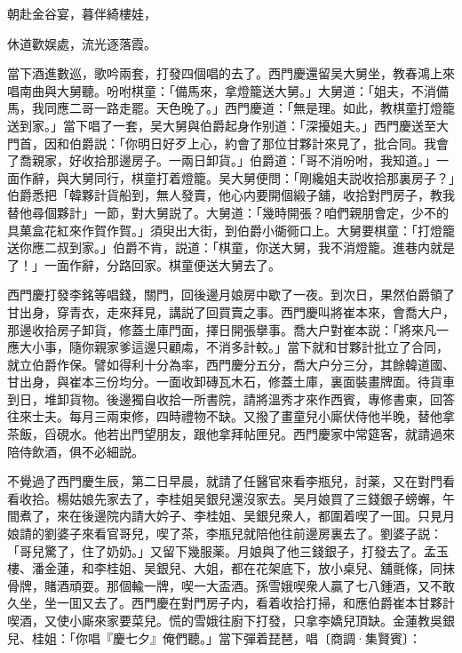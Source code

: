 \begin{myquote}
朝赴金谷宴，暮伴綺樓娃，

休道歡娱處，流光逐落霞。
\end{myquote}

當下酒進數巡，歌吟兩套，打發四個唱的去了。西門慶還留吴大舅坐，教春鴻上來唱南曲與大舅聽。吩咐棋童：「備馬來，拿燈籠送大舅。」大舅道：「姐夫，不消備馬，我同應二哥一路走罷。天色晚了。」西門慶道：「無是理。如此，教棋童打燈籠送到家。」當下唱了一套，吴大舅與伯爵起身作别道：「深擾姐夫。」西門慶送至大門首，因和伯爵説：「你明日好歹上心，約會了那位甘夥計來見了，批合同。我會了喬親家，好收拾那邊房子。一兩日卸貨。」伯爵道：「哥不消吩咐，我知道。」一面作辭，與大舅同行，棋童打着燈籠。吴大舅便問：「剛纔姐夫説收拾那裏房子？」伯爵悉把「韓夥計貨船到，無人發賣，他心内要開個緞子舖，收拾對門房子，教我替他尋個夥計」一節，對大舅説了。大舅道：「幾時開張？咱們親朋會定，少不的具菓盒花紅來作賀作賀。」須臾出大街，到伯爵小衚衕口上。大舅要棋童：「打燈籠送你應二叔到家。」伯爵不肯，説道：「棋童，你送大舅，我不消燈籠。進巷内就是了！」一面作辭，分路回家。棋童便送大舅去了。

西門慶打發李銘等唱錢，關門，回後邊月娘房中歇了一夜。到次日，果然伯爵領了甘出身，穿青衣，走來拜見，講説了回買賣之事。西門慶叫將崔本來，會喬大户，那邊收拾房子卸貨，修蓋土庫門面，擇日開張擧事。喬大户對崔本説：「將來凡一應大小事，隨你親家爹這邊只顧䖏，不消多計較。」當下就和甘夥計批立了合同，就立伯爵作保。譬如得利十分為率，西門慶分五分，喬大户分三分，其餘韓道國、甘出身，與崔本三份均分。一面收卸磚瓦木石，修蓋土庫，裏面裝畫牌面。待貨車到日，堆卸貨物。後邊獨自收拾一所書院，請將溫秀才來作西賓，專修書柬，回答往來士夫。每月三兩束修，四時禮物不缺。又撥了畫童兒小廝伏侍他半晚，替他拿茶飯，舀硯水。他若出門望朋友，跟他拿拜帖匣兒。西門慶家中常筵客，就請過來陪侍飲酒，俱不必細説。

不覺過了西門慶生辰，第二日早晨，就請了任醫官來看李瓶兒，討薬，又在對門看看收拾。楊姑娘先家去了，李桂姐吴銀兒還沒家去。吴月娘買了三錢銀子螃蠏，午間煮了，來在後邊院内請大妗子、李桂姐、吴銀兒衆人，都圍着喫了一囬。只見月娘請的劉婆子來看官哥兒，喫了茶，李瓶兒就陪他往前邊房裏去了。劉婆子説：「哥兒驚了，住了奶奶。」又留下幾服薬。月娘與了他三錢銀子，打發去了。孟玉樓、潘金蓮，和李桂姐、吴銀兒、大姐，都在花架底下，放小桌兒、舖氈條，同抹骨牌，賭酒頑耍。那個輸一牌，喫一大盃酒。孫雪娥喫衆人贏了七八鍾酒，又不敢久坐，坐一囬又去了。西門慶在對門房子内，看着收拾打掃，和應伯爵崔本甘夥計喫酒，又使小廝來家要菜兒。慌的雪娥往廚下打發，只拿李嬌兒頂缺。金蓮教吳銀兒、桂姐：「你唱『慶七夕』俺們聽。」當下彈着琵琶，唱〔商調·集賢賓〕：

